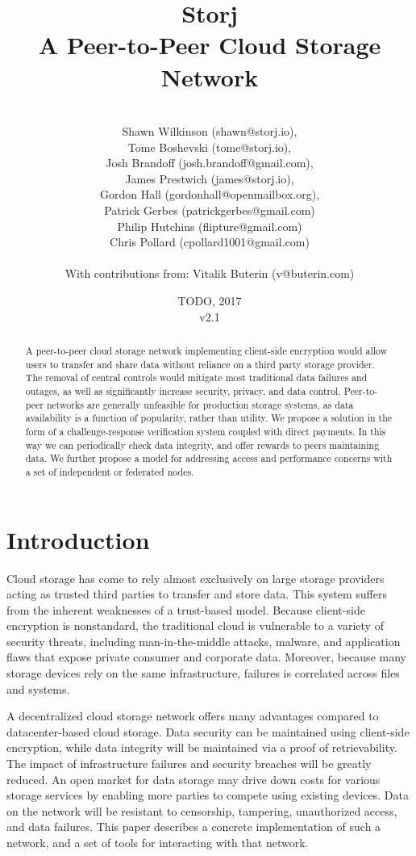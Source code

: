 \documentclass[a4paper,10pt]{article}
\title{\textbf{Storj\\A Peer-to-Peer Cloud Storage Network}}
\author{\\
Shawn Wilkinson (shawn@storj.io),\\
Tome Boshevski (tome@storj.io),\\
Josh Brandoff (josh.brandoff@gmail.com),\\
James Prestwich (james@storj.io),\\
Gordon Hall (gordonhall@openmailbox.org),\\
Patrick Gerbes (patrickgerbes@gmail.com)\\
Philip Hutchins (flipture@gmail.com)\\
Chris Pollard (cpollard1001@gmail.com)\\
\\
With contributions from: Vitalik Buterin (v@buterin.com)
}
\date {TODO, 2017 \\ v2.1}
\begin{document}
\maketitle
\begin{abstract}
A peer-to-peer cloud storage network implementing client-side encryption would allow users to transfer and share data without reliance on a third party storage provider. The removal of central controls would mitigate most traditional data failures and outages, as well as significantly increase security, privacy, and data control. Peer-to-peer networks are generally unfeasible for production storage systems, as data availability is a function of popularity, rather than utility. We propose a solution in the form of a challenge-response verification system coupled with direct payments. In this way we can periodically check data integrity, and offer rewards to peers maintaining data. We further propose a model for addressing access and performance concerns with a set of independent or federated nodes.
\end{abstract}


\section{Introduction}
Cloud storage has come to rely almost exclusively on large storage providers acting as trusted third parties to transfer and store data. This system suffers from the inherent weaknesses of a trust-based model. Because client-side encryption is nonstandard, the traditional cloud is vulnerable to a variety of security threats, including man-in-the-middle attacks, malware, and application flaws that expose private consumer and corporate data. Moreover, because many storage devices rely on the same infrastructure, failures is correlated across files and systems.

A decentralized cloud storage network offers many advantages compared to datacenter-based cloud storage. Data security can be maintained using client-side encryption, while data integrity will be maintained via a proof of retrievability. The impact of infrastructure failures and security breaches will be greatly reduced. An open market for data storage may drive down costs for various storage services by enabling more parties to compete using existing devices. Data on the network will be resistant to censorship, tampering, unauthorized access, and data failures. This paper describes a concrete implementation of such a network, and a set of tools for interacting with that network.
\end{document}
